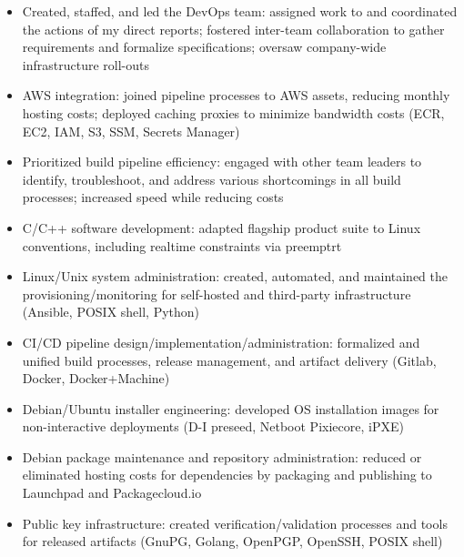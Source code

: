 \documentclass[letterpaper,10pt]{article}
\begin{document}

\begin{itemize}

\item
  Created, staffed, and led the DevOps team: assigned work to and coordinated
  the actions of my direct reports; fostered inter-team collaboration to gather
  requirements and formalize specifications; oversaw company-wide
  infrastructure roll-outs
\item
  AWS integration: joined pipeline processes to AWS assets, reducing monthly
  hosting costs; deployed caching proxies to minimize bandwidth costs (ECR,
  EC2, IAM, S3, SSM, Secrets Manager)
\item
  Prioritized build pipeline efficiency: engaged with other team leaders to
  identify, troubleshoot, and address various shortcomings in all build
  processes; increased speed while reducing costs
\item
  C/C++ software development: adapted flagship product suite to Linux
  conventions, including realtime constraints via preemptrt
\item
  Linux/Unix system administration: created, automated, and maintained the
  provisioning/monitoring for self-hosted and third-party infrastructure
  (Ansible, POSIX shell, Python)
\item
  CI/CD pipeline design/implementation/administration: formalized and unified
  build processes, release management, and artifact delivery (Gitlab, Docker,
  Docker+Machine)
\item
  Debian/Ubuntu installer engineering: developed OS installation images for
  non-interactive deployments (D-I preseed, Netboot Pixiecore, iPXE)
\item
  Debian package maintenance and repository administration: reduced or
  eliminated hosting costs for dependencies by packaging and publishing to
  Launchpad and Packagecloud.io
\item
  Public key infrastructure: created verification/validation processes and
  tools for released artifacts (GnuPG, Golang, OpenPGP, OpenSSH, POSIX shell)

\end{itemize}


\end{document}
